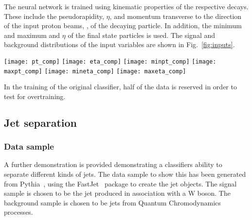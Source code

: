 The neural network is trained using kinematic properties of the respective decays.
These include the pseudorapidity, $\eta$, and momentum transverse to the direction of the 
input proton beams, \pt, of the decaying particle. In addition, the minimum and maximum \pt and $\eta$ 
of the final state particles is used. The signal and background distributions of the input variables
are shown in Fig.~\ref{fig:inputs}.
%
\begin{figure*}[t]
\centering
\texttt{[image: pt\_comp]}
\texttt{[image: eta\_comp]}
\texttt{[image: minpt\_comp]}
\texttt{[image: maxpt\_comp]}
\texttt{[image: mineta\_comp]}
\texttt{[image: maxeta\_comp]}
\caption{\small Comparison of the signal and background distributions
used to train the Keras B decay classifier.}
\label{fig:inputs}
\end{figure*}

In the training of the original classifier, half of the data is
reserved in order to test for overtraining.


\subsection{Jet separation}
\label{sec:hepGPD}

\subsubsection{Data sample}

A further demonstration is provided demonstrating a classifiers ability to separate different
kinds of jets. The data sample to show this has been generated from Pythia~\cite{Sjostrand:2007gs}, using the FastJet~\cite{Cacciari:2011ma} package
to create the jet objects. 
The signal sample is chosen to be the jet produced in association with a W boson.
The background sample is chosen to be jets from Quantum Chromodynamics processes.

